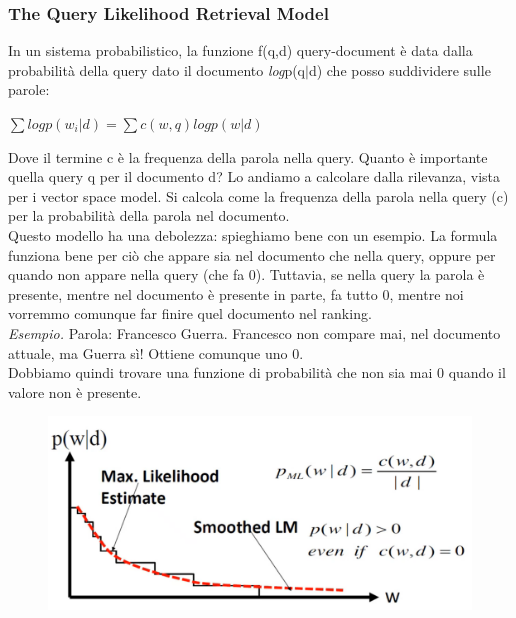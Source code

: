 \subsubsection{The Query Likelihood Retrieval Model}
In un sistema probabilistico, la funzione f(q,d) query-document è data dalla probabilità della query dato il documento \textit{log}p(q$|$d) che posso suddividere sulle parole:
\begin{center}
    \begin{math}
        \sum logp(w_i | d) = \sum c(w,q) logp(w|d)
    \end{math}
\end{center}
Dove il termine c è la frequenza della parola nella query. Quanto è importante quella query q per il documento d? Lo andiamo a calcolare dalla rilevanza, vista per i vector space model. Si calcola come la frequenza della parola nella query (c) per la probabilità della parola nel documento.
\\
Questo modello ha una debolezza: spieghiamo bene con un esempio. La formula funziona bene per ciò che appare sia nel documento che nella query, oppure per quando non appare nella query (che fa 0). Tuttavia, se nella query la parola è presente, mentre nel documento è presente in parte, fa tutto 0, mentre noi vorremmo comunque far finire quel documento nel ranking.
\\
\textit{Esempio.} Parola: Francesco Guerra. Francesco non compare mai, nel documento attuale, ma Guerra sì! Ottiene comunque uno 0.
\\
Dobbiamo quindi trovare una funzione di probabilità che non sia mai 0 quando il valore non è presente. 
\\
\begin{figure}[th]
    \centering
    \includegraphics[scale=0.35]{Text Analysis/img/likelihood.png}
\end{figure}

\newpage

